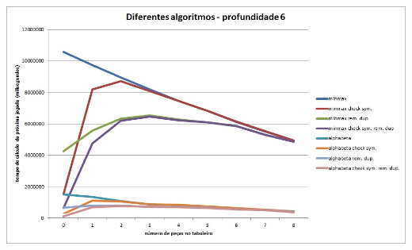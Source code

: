 \begin{table}[H]
\centering
\includegraphics[height=9.5cm]{performance/tempPerfComparisonDepth6.jpg}
\end{table}
